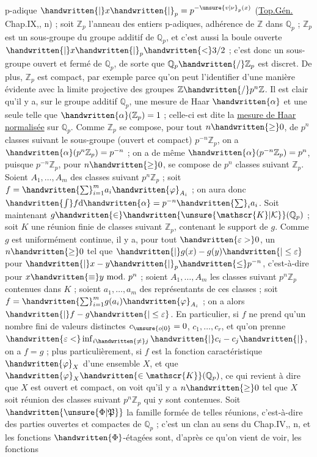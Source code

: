p-adique $\handwritten{|}x\handwritten{|}_{p}=p^{-\unsure{v|\nu}_{p}(x)}$ (\uline{Top.Gén.} Chap.IX,, n) ; soit $\mathbb{Z}_{p}$ l'anneau des entiers p-adiques, adhérence de $\mathbb{Z}$ dans $\mathbb{Q}_{p}$ ; $\mathbb{Z}_{p}$ est un sous-groupe du groupe additif de $\mathbb{Q}_{p}$, et c'est aussi la boule ouverte $\handwritten{|}x\handwritten{|}_{p}\handwritten{<}3/2$ ; c'est donc un sous-groupe ouvert et fermé de $\mathbb{Q}_{p}$, de sorte que $\mathbb{Q}_{p}\handwritten{/}\mathbb{Z}_{p}$ est discret. De plus, $\mathbb{Z}_{p}$ est compact, par exemple parce qu'on peut l'identifier d'une manière évidente avec la limite projective des groupes $\mathbb{Z}\handwritten{/}p^{n}\mathbb{Z}$. Il est clair qu'il y a, sur le groupe additif $\mathbb{Q}_{p}$, une mesure de Haar $\handwritten{\alpha}$ et une seule telle que $\handwritten{\alpha}(\mathbb{Z}_{p})=1$ ; celle-ci est dite la \uline{mesure de Haar normalisée} sur $\mathbb{Q}_{p}$. Comme $\mathbb{Z}_{p}$ se compose, pour tout $n\handwritten{\geq}0$, de $p^{n}$ classes suivant le sous-groupe (ouvert et compact) $p^{-n}\mathbb{Z}_{p}$, on a $\handwritten{\alpha}(p^{n}\mathbb{Z}_{p})=p^{-n}$ ; on a de même $\handwritten{\alpha}(p^{-n}\mathbb{Z}_{p})=p^{n}$, puisque $p^{-n}\mathbb{Z}_{p}$, pour $n\handwritten{\geq}0$, se compose de $p^{n}$ classes suivant $\mathbb{Z}_{p}$. Soient $A_{1},\ldots,A_{m}$ des classes suivant $p^{n}\mathbb{Z}_{p}$ ; soit $f=\handwritten{\sum}_{i=1}^{m}a_{i}\handwritten{\varphi}_{A_{i}}$ ; on aura donc $\handwritten{\int}f\mathrm{d}\handwritten{\alpha}=p^{-n}\handwritten{\sum}_{i}a_{i}$. Soit maintenant $g\handwritten{\in}\handwritten{\unsure{\mathscr{K}|\mathcal{K}}}(\mathbb{Q}_{p})$ ; soit $K$ une réunion finie de classes suivant $\mathbb{Z}_{p}$, contenant le support de $g$. Comme $g$ est uniformément continue, il y a, pour tout $\handwritten{\varepsilon> }0$, un $n\handwritten{\geq}0$ tel que $\handwritten{|}g(x)-g(y)\handwritten{|\leq\varepsilon}$ pour $\handwritten{|}x-y\handwritten{|}_{p}\handwritten{\leq}p^{-n}$, c'est-à-dire pour $x\handwritten{\equiv}y\ \mathrm{mod.}\ p^{n}$ ; soient $A_{1},\ldots,A_{m}$ les classes suivant $p^{n}\mathbb{Z}_{p}$ contenues dans $K$ ; soient $a_{1},\ldots,a_{m}$ des représentants de ces classes ; soit $f=\handwritten{\sum}_{i=1}^{m}g(a_{i})\handwritten{\varphi}_{A_{i}}$ ; on a alors $\handwritten{|}f-g\handwritten{|\leq\varepsilon}$. En particulier, si $f$ ne prend qu'un nombre fini de valeurs distinctes $c_{\unsure{o|0}}=0$, $c_{1},\ldots,c_{r}$, et qu'on prenne $\handwritten{\varepsilon<}\inf_{i\handwritten{\ne}j}\handwritten{|}c_{i}-c_{j}\handwritten{|}$, on a $f=g$ ; plus particulièrement, si $f$ est la fonction caractéristique $\handwritten{\varphi}_{X}$ d'une ensemble $X$, et que $\handwritten{\varphi}_{X}\handwritten{\in\mathscr{K}}(\mathbb{Q}_{p})$, ce qui revient à dire que $X$ est ouvert et compact, on voit qu'il y a $n\handwritten{\geq}0$ tel que $X$ soit réunion des classes suivant $p^{n}\mathbb{Z}_{p}$ qui y sont contenues. Soit $\handwritten{\unsure{\Phi|\mathfrak{P}}}$ la famille formée de telles réunions, c'est-à-dire des parties ouvertes et compactes de $\mathbb{Q}_{p}$ ; c'est un clan au sens du Chap.IV,, n, et les fonctions $\handwritten{\Phi}$-étagées sont, d'après ce qu'on vient de voir, les fonctions

